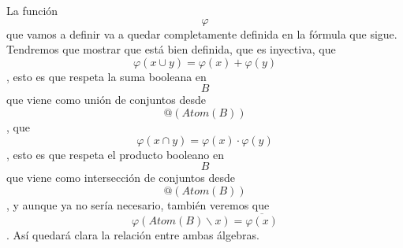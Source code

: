 \begin{enumerate}
\begin{enumerate}
\begin{enumerate}
      La función \[\varphi\]que vamos a definir va a quedar
      completamente definida en la fór\-mula que sigue. Tendremos que
      mostrar que está bien definida, que es inyectiva, que
      \[\varphi{{({x \cup y})} = \varphi}{{(x)} + \varphi}{(y)}\], esto
      es que respeta la suma booleana en \[B\]que viene como unión de
      conjuntos desde \[@\left( {\mathit{Atom}{(B)}} \right)\], que
      \[\varphi{{({x \cap y})} = \varphi}{{(x)} \cdot \varphi}{(y)}\],
      esto es que respeta el producto booleano en \[B\]que viene como
      intersección de conjun\-tos desde
      \[@\left( {\mathit{Atom}{(B)}} \right)\] , y aunque ya no sería
      necesario, también veremos que
      \[\varphi{\left( {\mathit{Atom}{{(B)} \smallsetminus x}} \right) = \overline{\varphi(x)}}\]
      . Así quedará clara la relación entre ambas álgebras.


\end{enumerate}
\end{enumerate}
\end{enumerate}
